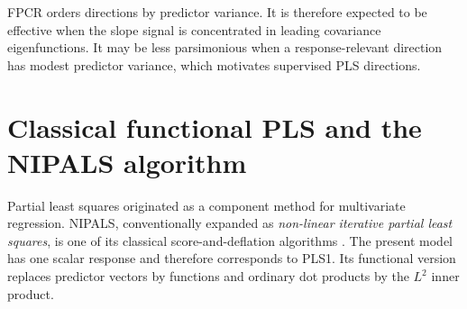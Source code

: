 FPCR orders directions by predictor variance.  It is therefore expected to
be effective when the slope signal is concentrated in leading covariance
eigenfunctions.  It may be less parsimonious when a response-relevant
direction has modest predictor variance, which motivates supervised PLS
directions.

\section{Classical functional PLS and the NIPALS algorithm}
\label{sec:methods-nipals}

Partial least squares originated as a component method for multivariate
regression.  NIPALS, conventionally expanded as \emph{non-linear iterative
partial least squares}, is one of its classical score-and-deflation
algorithms \parencite{wold_et_al_1984,geladi_kowalski_1986}.  The present
model has one scalar response and therefore corresponds to PLS1.  Its
functional version replaces predictor vectors by functions and ordinary dot
products by the $L^2$ inner product.

